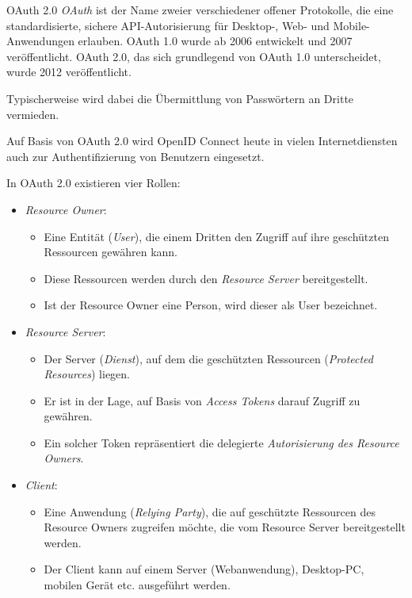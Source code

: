 \begin{defi}{OAuth 2.0}
    \emph{OAuth} ist der Name zweier verschiedener offener Protokolle, die eine standardisierte, sichere API-Autorisierung für Desktop-, Web- und Mobile-Anwendungen erlauben.
    OAuth 1.0 wurde ab 2006 entwickelt und 2007 veröffentlicht.
    OAuth 2.0, das sich grundlegend von OAuth 1.0 unterscheidet, wurde 2012 veröffentlicht.

    Typischerweise wird dabei die Übermittlung von Passwörtern an Dritte vermieden.

    Auf Basis von OAuth 2.0 wird OpenID Connect heute in vielen Internetdiensten auch zur Authentifizierung von Benutzern eingesetzt.

    In OAuth 2.0 existieren vier Rollen:
    \begin{itemize}
        \item \emph{Resource Owner}:
              \begin{itemize}
                  \item Eine Entität (\emph{User}), die einem Dritten den Zugriff auf ihre geschützten Ressourcen gewähren kann.
                  \item Diese Ressourcen werden durch den \emph{Resource Server} bereitgestellt.
                  \item Ist der Resource Owner eine Person, wird dieser als User bezeichnet.
              \end{itemize}
        \item \emph{Resource Server}:
              \begin{itemize}
                  \item Der Server (\emph{Dienst}), auf dem die geschützten Ressourcen (\emph{Protected Resources}) liegen.
                  \item Er ist in der Lage, auf Basis von \emph{Access Tokens} darauf Zugriff zu gewähren.
                  \item Ein solcher Token repräsentiert die delegierte \emph{Autorisierung des Resource Owners}.
              \end{itemize}
        \item \emph{Client}:
              \begin{itemize}
                  \item Eine Anwendung (\emph{Relying Party}), die auf geschützte Ressourcen des Resource Owners zugreifen möchte, die vom Resource Server bereitgestellt werden.
                  \item Der Client kann auf einem Server (Webanwendung), Desktop-PC, mobilen Gerät etc. ausgeführt werden.

\end{itemize}
\end{itemize}
\end{defi}
